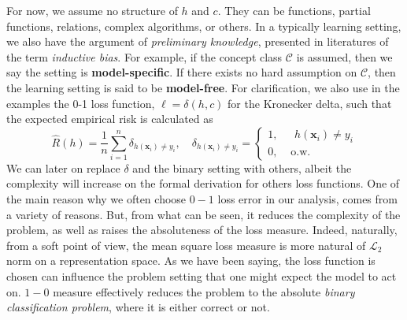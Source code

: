 For now, we assume no structure of $h$ and $c$. They can be functions, partial functions, relations, complex algorithms, or others. In a typically learning setting, we also have the argument of \textit{preliminary knowledge}, presented in literatures of the term \textit{inductive bias}. For example, if the concept class $\mathcal{C}$ is assumed, then we say the setting is \textbf{model-specific}. If there exists no hard assumption on $\mathcal{C}$, then the learning setting is said to be \textbf{model-free}. For clarification, we also use in the examples the 0-1 loss function, $\ell= \delta(h,c)$ for the Kronecker delta, such that the expected empirical risk is calculated as
\begin{equation}
    \hat{R}(h)=\frac{1}{n}\sum^n_{i=1}\delta_{h(\mathbf{x}_i)\ne y_i}, \quad \delta_{h(\mathbf{x}_i)\ne y_i}=\begin{cases}
        1,&\mbox{ $h(\mathbf{x}_i)\ne y_i$}\\
        0,&\mbox{ o.w.}
        \end{cases}
\end{equation} 
We can later on replace $\delta$ and the binary setting with others, albeit the complexity will increase on the formal derivation for others loss functions. One of the main reason why we often choose $0-1$ loss error in our analysis, comes from a variety of reasons. But, from what can be seen, it reduces the complexity of the problem, as well as raises the absoluteness of the loss measure. Indeed, naturally, from a soft point of view, the mean square loss measure is more natural of $\mathcal{L}_{2}$ norm on a representation space. As we have been saying, the loss function is chosen can influence the problem setting that one might expect the model to act on. $1-0$ measure effectively reduces the problem to the absolute \textit{binary classification problem}, where it is either correct or not. 

